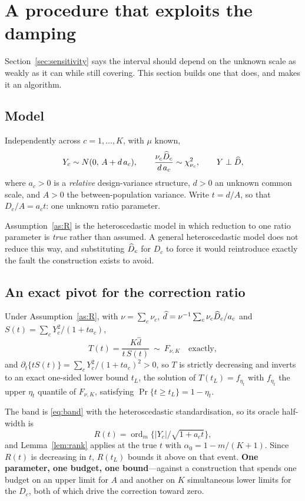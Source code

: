 \section{A procedure that exploits the damping}\label{sec:method}

Section~\ref{sec:sensitivity} says the interval should depend on the unknown
scale as weakly as it can while still covering. This section builds one that
does, and makes it an algorithm.

\subsection{Model}

\begin{assumption}[Model R]\label{as:R}
Independently across $c=1,\dots,K$, with $\mu$ known,
\[
Y_c\sim N(0,\,A+d\,a_c),\qquad
\frac{\nu_c\widehat D_c}{d\,a_c}\sim\chi^2_{\nu_c},\qquad Y\perp\widehat D,
\]
where $a_c>0$ is a \emph{relative} design-variance structure, $d>0$ an unknown
common scale, and $A>0$ the between-population variance. Write $t=d/A$, so that
$D_c/A=a_ct$: one unknown ratio parameter.
\end{assumption}

Assumption~\ref{as:R} is the heteroscedastic model in which reduction to one
ratio parameter is \emph{true} rather than assumed. A general heteroscedastic
model does not reduce this way, and substituting $\widehat D_c$ for $D_c$ to force it
would reintroduce exactly the fault the construction exists to avoid.

\subsection{An exact pivot for the correction ratio}

\begin{proposition}\label{prop:pivot}
Under Assumption~\ref{as:R}, with $\nu=\sum_c\nu_c$,
$\widehat d=\nu^{-1}\sum_c\nu_c\widehat D_c/a_c$ and
$S(t)=\sum_cY_c^2/(1+ta_c)$,
\[
T(t)=\frac{K\widehat d}{t\,S(t)}\ \sim\ F_{\nu,K}\quad\text{exactly},
\]
and $\partial_t\{tS(t)\}=\sum_cY_c^2/(1+ta_c)^2>0$, so $T$ is strictly decreasing
and inverts to an exact one-sided lower bound $t_L$, the solution of
$T(t_L)=f_{\eta_t}$ with $f_{\eta_t}$ the upper $\eta_t$ quantile of
$F_{\nu,K}$, satisfying $\Pr\{t\ge t_L\}=1-\eta_t$.
\end{proposition}

The band is \eqref{eq:band} with the heteroscedastic standardisation, so its
oracle half-width is
\[
R(t)=\operatorname{ord}_m\big\{|Y_c|/\sqrt{1+a_ct}\big\},
\]
and Lemma~\ref{lem:rank} applies at the true $t$ with $\alpha_0=1-m/(K+1)$.
Since $R(t)$ is
decreasing in $t$, $R(t_L)$ bounds it above on that event. \textbf{One parameter,
one budget, one bound}---against a construction that spends one budget on an
upper limit for $A$ and another on $K$ simultaneous lower limits for the $D_c$,
both of which drive the correction toward zero.

